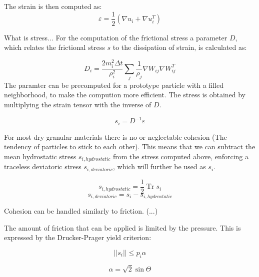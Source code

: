 \documentclass[intern]{cgMA}
\DeclareMathOperator{\Tr}{Tr}
\begin{document}
    The strain is then computed as:
    \begin{equation}
        \varepsilon = \frac{1}{2} (\nabla u_i + \nabla u_i^T)
    \end{equation}

    What is stress...
    For the computation of the frictional stress a parameter $D$, which relates the frictional stress $s$ to the dissipation of strain, is calculated as:

    \begin{equation}
        D_i = \frac{2 m_i^2 \Delta t}{\rho_i^2} \sum_j \frac{1}{\rho_j} \nabla W_{ij}  \nabla W_{ij}^T
    \end{equation}
    The paramter can be precomputed for a prototype particle with a filled neighborhood, to make the compution more efficient.
    The stress is obtained by multiplying the strain tensor with the inverse of $D$. 
    
    \begin{equation}
        s_i = D^{-1} \varepsilon
    \end{equation}

    For most dry granular materials there is no or neglectable cohesion (The tendency of particles to stick to each other). This means that we can subtract the mean hydrostatic stress $s_{i, hydrostatic}$ from the stress computed above, enforcing a traceless deviatoric stress $s_{i, deviatoric}$, which will further be used as $s_i$. 

    \begin{equation}
        s_{i, hydrostatic} = \frac{1}{2} \Tr s_i 
    \end{equation}
    \begin{equation}
        s_{i, deviatoric} = s_i - s_{i, hydrostatic} 
    \end{equation}

    Cohesion can be handled similarly to friction. (...)

    The amount of friction that can be applied is limited by the pressure. This is expressed by the Drucker-Prager yield criterion:

    \begin{equation}
        ||s_i|| \leq p_i \alpha
    \end{equation}

    \begin{equation}
        \alpha = \sqrt{2} \sin \Theta
    \end{equation}
\end{document}

